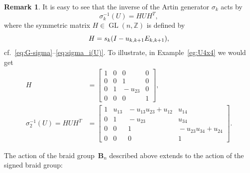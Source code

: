 \documentclass[11pt, letterpaper]{amsart}
\newcommand{\hide}[1]{}
\theoremstyle{definition}
\newtheorem{remark}[theorem]{Remark}
\numberwithin{equation}{section}
\def\ZZ{{\mathbb Z}}
\def\GL{{\operatorname{GL}}}
\begin{document}
\begin{remark}
\label{rem:sigma-inverse}
It is easy to see that the inverse of the Artin generator $\sigma_k$ acts by
\begin{equation}
\label{eq:sigmainverse_i(U)}
\sigma^{-1}_k(U) = H  U H^T, 
\end{equation}
where the symmetric matrix $H\in\GL(n,\ZZ)$ is defined by 
\begin{equation}
\label{eq:H-sigma}
H=s_k (I - u_{k,k+1} E_{k,k+1}) ,
\vspace{-1pt}
\end{equation}
cf.\ \eqref{eq:G-sigma}--\eqref{eq:sigma_i(U)}. 
To illustrate, in Example~\ref{eg:U4x4} we would get
\begin{align}
\nonumber
H&=\begin{bmatrix}
1 & 0 & 0 & 0 \\
0 & 0 & 1 & 0 \\
0 & 1 & \!\!-u_{2 3}\!\! & 0 \\
0 & 0 & 0 & 1
\end{bmatrix}\!\!,
\\[.05in]
\label{eq:sigmaiverse2U4u}
\sigma_2^{-1}(U)=HUH^T&= 
\begin{bmatrix}
1 & u_{13} & \!\!-u_{13}u_{23}+u_{12}\! & u_{14} \\
0 & 1 & \!-u_{23}\! & u_{34} \\
0 & 0 & 1 & \!-u_{23}u_{34}+u_{24} \\
0 & 0 & 0 & 1
\end{bmatrix}\!\!. 
\end{align}
\end{remark}

\hide{
Applying $\sigma_3$, we then obtain:
\begin{equation}
\label{eq:sigma3sigma2}
\sigma_3(\sigma_2(U))=
\begin{bmatrix}
1 & \!\!-u_{12}u_{23}+u_{13}\! & \!\!-u_{12}u_{24}+u_{14}\! & u_{12} \\
0 & 1 & u_{34} & \!-u_{23} \\
0 & 0 & 1 & \!-u_{24} \\
0 & 0 & 0 & 1
\end{bmatrix}\!\!. 
\end{equation}
} %

The action of the braid group~$\mathbf{B}_n$ described above extends to the action of the 
signed braid group:  

\end{document}
